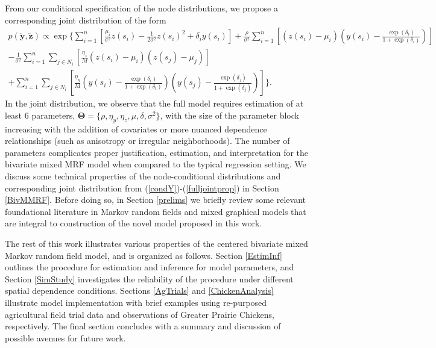 \documentclass[12pt, a4paper, twoside]{article}
\begin{document}
From our conditional specification of the node distributions, we propose a corresponding joint distribution of the form
\begin{multline} \label{fulljointprop}
p(\boldsymbol{\utilde{y},\utilde{z}}) \propto \exp\lbrace \sum_{i = 1}^{n} \left[\frac{\mu_i}{\sigma^2}z(s_i) - \frac{1}{2\sigma^2}z(s_i)^2 + \delta_i y(s_i)\right] +  \frac{\rho}{\sigma^2} \sum_{i = 1}^{n} \left[\left(z(s_i)-\mu_i\right)\left(y(s_i) - \frac{\exp{(\delta_i)}}{1+\exp{(\delta_i)}}\right)\right]\\
-\frac{1}{\sigma^2}\sum_{i=1}^{n}\sum_{j\in N_i}\left[ \frac{\eta_z}{M}\left( z(s_i)-\mu_i\right)\left(z(s_j)-\mu_j \right)\right]\\
+ \sum_{i=1}^{n}\sum_{j\in N_i}\left[\frac{\eta_y}{M}\left(y(s_i) - \frac{\exp{(\delta_i)}}{1+\exp{(\delta_i)}}\right) \left(y(s_j) - \frac{\exp{(\delta_j)}}{1+\exp{(\delta_j)}}\right)\right] \rbrace .
\end{multline}
In the joint distribution, we observe that the full model requires estimation of at least 6 parameters, $\boldsymbol{\Theta}=\lbrace\rho,\eta_y,\eta_z,\mu,\delta,\sigma^2\rbrace$, with the size of the parameter block increasing with the addition of covariates or more nuanced dependence relationships (such as anisotropy or irregular neighborhoods). The number of parameters complicates proper justification, estimation, and interpretation for the bivariate mixed MRF model when compared to the typical regression setting. We discuss some technical properties of the node-conditional distributions and corresponding joint distribution from (\ref{condY})-(\ref{fulljointprop}) in Section \ref{BivMMRF}. Before doing so, in Section \ref{prelims} we briefly review some relevant foundational literature in Markov random fields and mixed graphical models that are integral to construction of the novel model proposed in this work.

The rest of this work illustrates various properties of the centered bivariate mixed Markov random field model, and is organized as follows. Section \ref{EstimInf} outlines the procedure for estimation and inference for model parameters, and Section \ref{SimStudy} investigates the reliability of the procedure under different spatial dependence conditions. Sections \ref{AgTrials} and \ref{ChickenAnalysis} illustrate model implementation with brief examples using re-purposed agricultural field trial data and observations of Greater Prairie Chickens, respectively. The final section concludes with a summary and discussion of possible avenues for future work.
\end{document}
